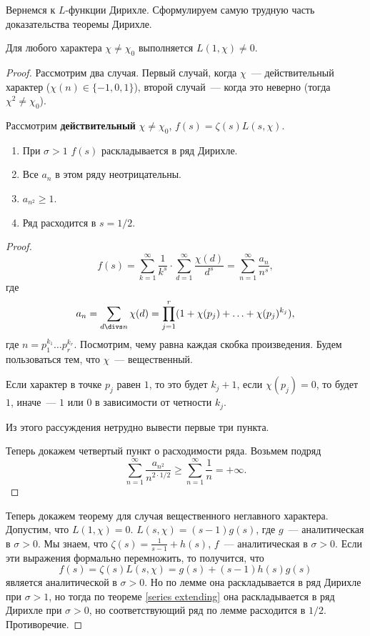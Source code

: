 Вернемся к $L$-функции Дирихле. Сформулируем самую трудную часть доказательства теоремы Дирихле.
\begin{theorem}
  Для любого характера $\chi \ne \chi_0$ выполняется $L(1, \chi) \ne 0$.
\end{theorem}
\begin{proof}
  Рассмотрим два случая.
  Первый случай, когда $\chi$~— действительный характер ($\chi(n) \in \{-1, 0, 1\}$), второй случай~— когда это неверно (тогда $\chi^2 \ne \chi_0$).
  
  \begin{lemma}
    Рассмотрим \textbf{действительный} $\chi \ne \chi_0$, $f(s) = \zeta(s) L(s, \chi)$.
    \begin{enumerate}
      \item При $\sigma > 1$ $f(s)$ раскладывается в ряд Дирихле.
      \item Все $a_n$ в этом ряду неотрицательны.
      \item $a_{n^2} \geq 1$.
      \item Ряд расходится в $s = 1/2$.
    \end{enumerate}   
  \end{lemma}
  \begin{proof}
    $$
      f(s) = \sum_{k=1}^{\infty} \frac{1}{k^s} \cdot \sum_{d=1}^{\infty} \frac{\chi(d)}{d^s} = \sum_{n=1}^{\infty} \frac{a_n}{n^s},
    $$
    где
    $$
      a_n = \sum_{d \divs n} \chi(d) = \prod_{j=1}^r (1 + \chi(p_j) + \ldots + \chi(p_j)^{k_j}),
    $$
    где $n = p_1^{k_1} \ldots p_r^{k_r}$.
    Посмотрим, чему равна каждая скобка произведения. Будем пользоваться тем, что $\chi$~— вещественный.
    
    Если характер в точке $p_j$ равен $1$, то это будет $k_j + 1$, если $\chi(p_j) = 0$, то будет $1$, иначе~— $1$ или $0$ в зависимости от четности $k_j$.
    
    Из этого рассуждения нетрудно вывести первые три пункта.
    
    Теперь докажем четвертый пункт о расходимости ряда. Возьмем подряд $$
      \sum_{n=1}^{\infty} \frac{a_{n^2}}{n^{2 \cdot 1/2}} \geq \sum_{n=1}^{\infty} \frac 1n = +\infty.
    $$
  \end{proof}
  Теперь докажем теорему для случая вещественного неглавного характера. Допустим, что $L(1, \chi) = 0$.
  $L(s, \chi) = (s - 1) g(s)$, где $g$~— аналитическая в $\sigma > 0$.
  Мы знаем, что $\zeta(s) = \frac{1}{s-1} + h(s)$, $f$~— аналитическая в $\sigma > 0$. Если эти выражения формально перемножить, то получится, что
  $$
    f(s) = \zeta(s) L(s, \chi) = g(s) + (s - 1) h(s) g(s)
  $$
  является аналитической в $\sigma > 0$. Но по лемме она раскладывается в ряд Дирихле при $\sigma > 1$, но тогда по теореме \ref{series extending} она раскладывается в ряд Дирихле при $\sigma > 0$, но соответствующий ряд по лемме расходится в $1/2$. Противоречие.
  

\end{proof}

